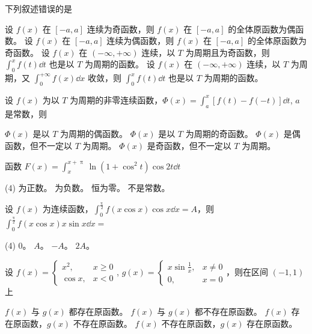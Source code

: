\begin{ti}
	下列叙述错误的是
	\begin{tasks}
		\task 设 $f(x)$ 在 $[-a,a]$ 连续为奇函数，则 $f(x)$ 在 $[-a,a]$ 的全体原函数为偶函数。
		\task 设 $f(x)$ 在 $[-a,a]$ 连续为偶函数，则 $f(x)$ 在 $[-a,a]$ 的全体原函数为奇函数。
		\task 设 $f(x)$ 在 $(-\infty,+\infty)$ 连续，以 $T$ 为周期且为奇函数，则 $\int_0^x f(t) \dd{t}$ 也是以 $T$ 为周期的函数。
		\task 设 $f(x)$ 在 $(-\infty,+\infty)$ 连续，以 $T$ 为周期，又 $\int_0^{+\infty} f(x) \dd{x}$ 收敛，则 $\int_0^x f(t) \dd{t}$ 也是以 $T$ 为周期的函数。
	\end{tasks}
\end{ti}

\begin{ti}
	设 $f(x)$ 为以 $T$ 为周期的非零连续函数，$\varPhi(x) = \int_a^x [f(t) - f(-t)] \dd{t}$, $a$ 是常数，则
	\begin{tasks}
		\task $\varPhi(x)$ 是以 $T$ 为周期的偶函数。
		\task $\varPhi(x)$ 是以 $T$ 为周期的奇函数。
		\task $\varPhi(x)$ 是偶函数，但不一定以 $T$ 为周期。
		\task $\varPhi(x)$ 是奇函数，但不一定以 $T$ 为周期。
	\end{tasks}
\end{ti}

\begin{ti}
	函数 $F(x) = \int_x^{x+\uppi} \ln(1+\cos^2t) \cos 2t \dd{t}$
	\begin{tasks}(4)
		\task 为正数。
		\task 为负数。
		\task 恒为零。
		\task 不是常数。
	\end{tasks}
\end{ti}

\begin{ti}
	设 $f(x)$ 为连续函数，$\int_0^{\frac{\uppi}{2}} f(x \cos x) \cos x \dd{x} = A$，则 $\int_0^{\frac{\uppi}{2}} f(x \cos x) x \sin x \dd{x} = $
	\begin{tasks}(4)
		\task $0$。
		\task $A$。
		\task $-A$。
		\task $2A$。
	\end{tasks}
\end{ti}

\begin{ti}
	设 $f(x) = \begin{cases}
		x^2, & x \geq 0 \\
		\cos x, & x < 0
	\end{cases}$, $g(x) = \begin{cases}
		x \sin \frac{1}{x}, & x \ne 0 \\
		0, & x = 0
	\end{cases}$，则在区间 $(-1,1)$ 上
	\begin{tasks}
		\task $f(x)$ 与 $g(x)$ 都存在原函数。
		\task $f(x)$ 与 $g(x)$ 都不存在原函数。
		\task $f(x)$ 存在原函数，$g(x)$ 不存在原函数。
		\task $f(x)$ 不存在原函数，$g(x)$ 存在原函数。
	\end{tasks}
\end{ti}

